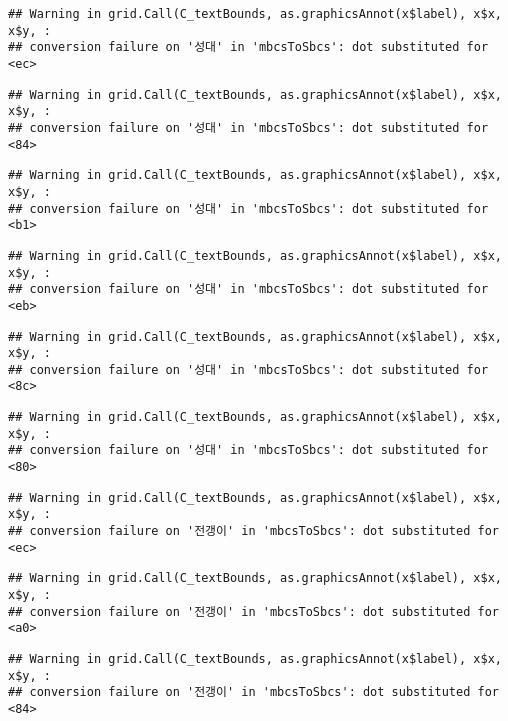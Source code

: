 \documentclass[
]{article}
\begin{document}
\begin{verbatim}
## Warning in grid.Call(C_textBounds, as.graphicsAnnot(x$label), x$x, x$y, :
## conversion failure on '성대' in 'mbcsToSbcs': dot substituted for <ec>
\end{verbatim}

\begin{verbatim}
## Warning in grid.Call(C_textBounds, as.graphicsAnnot(x$label), x$x, x$y, :
## conversion failure on '성대' in 'mbcsToSbcs': dot substituted for <84>
\end{verbatim}

\begin{verbatim}
## Warning in grid.Call(C_textBounds, as.graphicsAnnot(x$label), x$x, x$y, :
## conversion failure on '성대' in 'mbcsToSbcs': dot substituted for <b1>
\end{verbatim}

\begin{verbatim}
## Warning in grid.Call(C_textBounds, as.graphicsAnnot(x$label), x$x, x$y, :
## conversion failure on '성대' in 'mbcsToSbcs': dot substituted for <eb>
\end{verbatim}

\begin{verbatim}
## Warning in grid.Call(C_textBounds, as.graphicsAnnot(x$label), x$x, x$y, :
## conversion failure on '성대' in 'mbcsToSbcs': dot substituted for <8c>
\end{verbatim}

\begin{verbatim}
## Warning in grid.Call(C_textBounds, as.graphicsAnnot(x$label), x$x, x$y, :
## conversion failure on '성대' in 'mbcsToSbcs': dot substituted for <80>
\end{verbatim}

\begin{verbatim}
## Warning in grid.Call(C_textBounds, as.graphicsAnnot(x$label), x$x, x$y, :
## conversion failure on '전갱이' in 'mbcsToSbcs': dot substituted for <ec>
\end{verbatim}

\begin{verbatim}
## Warning in grid.Call(C_textBounds, as.graphicsAnnot(x$label), x$x, x$y, :
## conversion failure on '전갱이' in 'mbcsToSbcs': dot substituted for <a0>
\end{verbatim}

\begin{verbatim}
## Warning in grid.Call(C_textBounds, as.graphicsAnnot(x$label), x$x, x$y, :
## conversion failure on '전갱이' in 'mbcsToSbcs': dot substituted for <84>
\end{verbatim}
\end{document}
